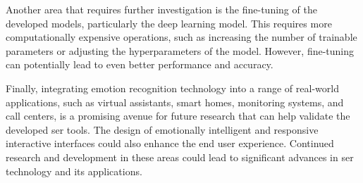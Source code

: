 Another area that requires further investigation is the fine-tuning of the developed models, particularly the deep learning model. This requires more computationally expensive operations, such as increasing the number of trainable parameters or adjusting the hyperparameters of the model. However, fine-tuning can potentially lead to even better performance and accuracy.

Finally, integrating emotion recognition technology into a range of real-world applications, such as virtual assistants, smart homes, monitoring systems, and call centers, is a promising avenue for future research that can help validate the developed \ac{ser} tools. The design of emotionally intelligent and responsive interactive interfaces could also enhance the end user experience. Continued research and development in these areas could lead to significant advances in \ac{ser} technology and its applications.